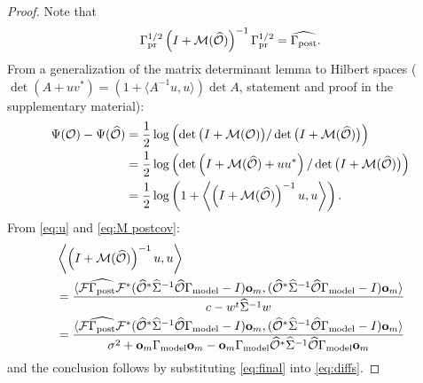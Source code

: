 \documentclass{article}
\begin{document}
\begin{proof}
  Note that
  \begin{equation}\label{eq:M postcov}
    \Gamma_{\textup{pr}}^{1/2} \left (I + \mathcal{M}( \widehat{\mathcal{O}} ) \right )^{-1} \Gamma_{\textup{pr}}^{1/2} = \widehat{\Gamma_{\textup{post}}}.
  \end{equation}
  From a generalization of the matrix determinant lemma to Hilbert
  spaces ($\det(A + uv^*) = (1 + \langle A^{-1} u,u \rangle) \det
  A$, statement and proof in the supplementary material):
  \begin{align}\label{eq:diffs}
    \begin{split}
      \Psi( \mathcal{O} ) - \Psi( \widehat{\mathcal{O}} )
      &= \frac12 \log \left (\det \big ( I + \mathcal{M} ( \mathcal{O} ) \big ) / \det \big ( I + \mathcal{M} (\widehat{\mathcal{O}}) \big ) \right )\\
      &= \frac12  \log \left (\det \left ( I + \mathcal{M}(\widehat{\mathcal{O}}) + uu^* \right ) / \det \big ( I + \mathcal{M} (\widehat{\mathcal{O}}) \big )\right ) \\
      &= \frac12 \log \left ( 1 + \left \langle \left ( I+\mathcal{M}(\widehat{\mathcal{O}}) \right )^{-1} u, u  \right \rangle \right ).
    \end{split}
  \end{align}
  From \eqref{eq:u} and \eqref{eq:M postcov}:
  \begin{align}\label{eq:final}
    \begin{split}
      &\left \langle \left (I+\mathcal{M} (\widehat{\mathcal{O}})\right )^{-1}u, u \right \rangle\\
      &= \frac{
        \langle \mathcal{F} \widehat{\Gamma_{\textup{post}}} \mathcal{F}^* (\widehat{\mathcal{O}}^* \widehat{\Sigma}^{-1} \widehat{\mathcal{O}} \Gamma_{\textup{model}} - I ) \mathbf{o}_m,
        (\widehat{\mathcal{O}}^* \widehat{\Sigma}^{-1} \widehat{\mathcal{O}} \Gamma_{\textup{model}} - I ) \mathbf{o}_m \rangle
      }{
        c- w^t \widehat{\Sigma}^{-1} w
      }\\
      &= 
      \frac{
      \langle \mathcal{F} \widehat{\Gamma_{\textup{post}}} \mathcal{F}^* (\widehat{\mathcal{O}}^* \widehat{\Sigma}^{-1} \widehat{\mathcal{O}} \Gamma_{\textup{model}} - I ) \mathbf{o}_m,
      (\widehat{\mathcal{O}}^* \widehat{\Sigma}^{-1} \widehat{\mathcal{O}} \Gamma_{\textup{model}} - I ) \mathbf{o}_m \rangle
      }{
        \sigma^2 + \mathbf{o}_m \Gamma_{\textup{model}} \mathbf{o}_m - \mathbf{o}_m \Gamma_{\textup{model}} \widehat{\mathcal{O}}^* \widehat{\Sigma}^{-1} \widehat{\mathcal{O}} \Gamma_{\textup{model}} \mathbf{o}_m 
      }
    \end{split}
  \end{align}
  and the conclusion follows by substituting \eqref{eq:final} into
  \eqref{eq:diffs}.
\end{proof}
\end{document}
